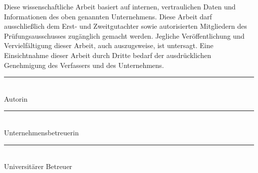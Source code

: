 Diese wissenschaftliche Arbeit basiert auf internen, vertraulichen Daten und Informationen des oben genannten Unternehmens. Diese Arbeit darf ausschließlich dem Erst- und Zweitgutachter sowie autorisierten Mitgliedern des Prüfungsausschusses zugänglich gemacht werden. Jegliche Veröffentlichung und Vervielfältigung dieser Arbeit, auch auszugsweise, ist untersagt. Eine Einsichtnahme dieser Arbeit durch Dritte bedarf der ausdrücklichen Genehmigung des Verfassers und des Unternehmens.

\vspace{2cm}

\noindent
\begin{minipage}[t]{0.3\textwidth}
    \rule{\textwidth}{0.4pt} \\
    Autorin
\end{minipage}
\hfill
\begin{minipage}[t]{0.3\textwidth}
    \rule{\textwidth}{0.4pt} \\
    Unternehmensbetreuerin
\end{minipage}
\hfill
\begin{minipage}[t]{0.3\textwidth}
    \rule{\textwidth}{0.4pt} \\
    Universitärer Betreuer 
\end{minipage}
